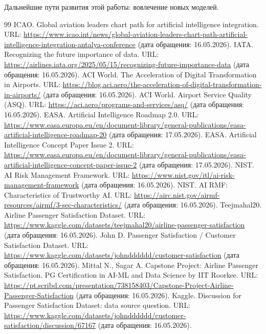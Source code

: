 \documentclass[14pt,a4paper]{extreport}
\renewcommand{\bibname}{Список использованных источников}
\renewcommand{\bibname}{Список использованных источников}%
\begin{document}
Дальнейшие пути развития этой работы: вовлечение новых моделей.

\renewcommand{\bibname}{Список использованных источников}
\begin{thebibliography}{99}
 ICAO. Global aviation leaders chart path for artificial intelligence integration. URL: \url{https://www.icao.int/news/global-aviation-leaders-chart-path-artificial-intelligence-integration-antalya-conference} (дата обращения: 16.05.2026).
 IATA. Recognizing the future importance of data. URL: \url{https://airlines.iata.org/2025/05/15/recognizing-future-importance-data} (дата обращения: 16.05.2026).
 ACI World. The Acceleration of Digital Transformation in Airports. URL: \url{https://blog.aci.aero/the-acceleration-of-digital-transformation-in-airports/} (дата обращения: 16.05.2026).
 ACI World. Airport Service Quality (ASQ). URL: \url{https://aci.aero/programs-and-services/asq/} (дата обращения: 16.05.2026).
 EASA. Artificial Intelligence Roadmap 2.0. URL: \url{https://www.easa.europa.eu/en/document-library/general-publications/easa-artificial-intelligence-roadmap-20} (дата обращения: 17.05.2026).
 EASA. Artificial Intelligence Concept Paper Issue 2. URL: \url{https://www.easa.europa.eu/en/document-library/general-publications/easa-artificial-intelligence-concept-paper-issue-2} (дата обращения: 17.05.2026).
 NIST. AI Risk Management Framework. URL: \url{https://www.nist.gov/itl/ai-risk-management-framework} (дата обращения: 16.05.2026).
 NIST. AI RMF: Characteristics of Trustworthy AI. URL: \url{https://airc.nist.gov/airmf-resources/airmf/3-sec-characteristics/} (дата обращения: 16.05.2026).
 Teejmahal20. Airline Passenger Satisfaction Dataset. URL: \url{https://www.kaggle.com/datasets/teejmahal20/airline-passenger-satisfaction} (дата обращения: 16.05.2026).
 John D. Passenger Satisfaction / Customer Satisfaction Dataset. URL: \url{https://www.kaggle.com/datasets/johndddddd/customer-satisfaction} (дата обращения: 16.05.2026).
 Mittal N., Sagar A. Capstone Project: Airline Passenger Satisfaction. PG Certification in AI-ML and Data Science by IIT Roorkee. URL: \url{https://pt.scribd.com/presentation/738158403/Capstone-Project-Airline-Passenger-Satisfaction} (дата обращения: 16.05.2026).
 Kaggle. Discussion for Passenger Satisfaction Dataset: data source question. URL: \url{https://www.kaggle.com/datasets/johndddddd/customer-satisfaction/discussion/67167} (дата обращения: 16.05.2026).

\end{thebibliography}
\end{document}
